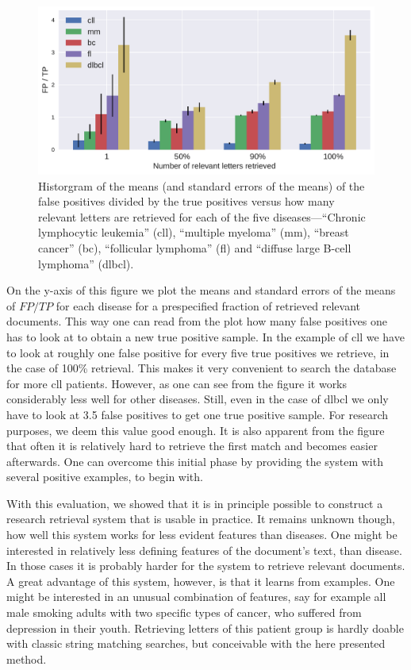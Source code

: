 \begin{figure}[t]
	\includegraphics[width=\textwidth]{figures/intelligent_search}
	\caption{Historgram of the means (and standard errors of the means) of the false positives divided by the true positives versus how many relevant letters are retrieved for each of the five diseases---``Chronic lymphocytic leukemia'' (cll), ``multiple myeloma'' (mm), ``breast cancer'' (bc), ``follicular lymphoma'' (fl) and ``diffuse large B-cell lymphoma'' (dlbcl).}
	\label{fig:intelligent_search}
\end{figure} 

On the y-axis of this figure we plot the means and standard errors of the means of $FP/TP$ for each disease for a prespecified fraction of retrieved relevant documents. This way one can read from the plot how many false positives one has to look at to obtain a new true positive sample. In the example of cll we have to look at roughly one false positive for every five true positives we retrieve, in the case of 100\% retrieval. This makes it very convenient to search the database for more cll patients. However, as one can see from the figure it works considerably less well for other diseases. Still, even in the case of dlbcl we only have to look at 3.5 false positives to get one true positive sample. For research purposes, we deem this value good enough. It is also apparent from the figure that often it is relatively hard to retrieve the first match and becomes easier afterwards. One can overcome this initial phase by providing the system with several positive examples, to begin with.

With this evaluation, we showed that it is in principle possible to construct a research retrieval system that is usable in practice. It remains unknown though, how well this system works for less evident features than diseases. One might be interested in relatively less defining features of the document's text, than disease. In those cases it is probably harder for the system to retrieve relevant documents. A great advantage of this system, however, is that it learns from examples. One might be interested in an unusual combination of features, say for example all male smoking adults with two specific types of cancer, who suffered from depression in their youth. Retrieving letters of this patient group is hardly doable with classic string matching searches, but conceivable with the here presented method.

